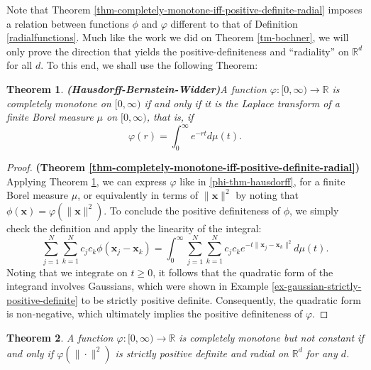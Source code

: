 \documentclass[12pt]{report} %
\newtheorem{theorem}{Theorem}
\newcommand{\tmmathbf}[1]{\ensuremath{\boldsymbol{#1}}}
\newcommand{\tmstrong}[1]{\textbf{#1}}
\begin{document}
Note that Theorem \ref{thm-completely-monotone-iff-positive-definite-radial}
imposes a relation between functions $\phi$ and $\varphi$ different to that of
Definition \ref{radialfunctions}. Much like the work we did on Theorem
\ref{tm-bochner}, we will only prove the direction that yields the
positive-definiteness and ``radiality'' on $\mathbb{R}^d$ for all $d$. To this
end, we shall use the following Theorem:

\begin{theorem}
  {\tmstrong{(Hausdorff-Bernstein-Widder)}}\label{thm-hausdorff-bernstein-widder}
  A function $\varphi : [0, \infty) \rightarrow \mathbb{R}$ is completely
  monotone on $[0, \infty)$ if and only if it is the Laplace transform of a
  finite  Borel measure $\mu$ on $[0, \infty)$, that is, if
  \begin{equation}
    \varphi (r) = \int_0^{\infty} e^{- r t} d \mu (t) .
    \label{phi-thm-hausdorff}
  \end{equation}
\end{theorem}

\begin{proof}
  {\tmstrong{(Theorem
  \ref{thm-completely-monotone-iff-positive-definite-radial})}} Applying
  Theorem \ref{thm-hausdorff-bernstein-widder}, we can express $\varphi$ like
  in \eqref{phi-thm-hausdorff}, for a finite Borel measure $\mu$,
  or equivalently in terms of $\| \tmmathbf{x} \|^2$ by noting that $\phi
  (\tmmathbf{x}) = \varphi (\| \tmmathbf{x} \|^2)$. To conclude the positive
  definiteness of $\phi$, we simply check the definition and apply the
  linearity of the integral:
  \[ \sum_{j = 1}^N \sum_{k = 1}^N c_j c_k \phi (\tmmathbf{x}_j
     -\tmmathbf{x}_k) = \int_0^{\infty} \sum_{j = 1}^N \sum_{k = 1}^N c_j c_k
     e^{- t \| \tmmathbf{x}_j -\tmmathbf{x}_k \|^2} d \mu (t) . \]
  Noting that we integrate on $t \geq 0$, it follows that the quadratic form of
  the integrand involves Gaussians, which were shown in Example
  \ref{ex-gaussian-strictly-positive-definite} to be strictly positive
  definite. Consequently, the quadratic form is non-negative, which ultimately
  implies the positive definiteness of $\varphi$.
\end{proof}

\begin{theorem}
  A function $\varphi : [0, \infty) \rightarrow \mathbb{R}$ is completely
  monotone but not constant if and only if $\varphi (\| \cdot \|^2)$ is
  strictly positive definite and radial on $\mathbb{R}^d$ for any $d$.
  {}
\end{theorem}
\end{document}
